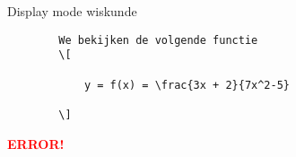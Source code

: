 \begin{frame}[fragile]{Display mode wiskunde}
    
    \begin{verbatim}
        We bekijken de volgende functie
        \[

            y = f(x) = \frac{3x + 2}{7x^2-5}

        \]
    \end{verbatim}
    
\begin{tcolorbox}[width=11cm, size=small]
    \textbf{\textcolor{red}{ERROR!}}
\end{tcolorbox}
    
\end{frame}
